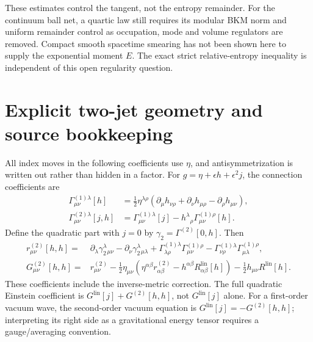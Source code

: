 \documentclass[12pt]{article}
\theoremstyle{definition}
\theoremstyle{remark}
\newcommand{\Glin}{G^{\mathrm{lin}}}
\begin{document}
These estimates control the tangent, not the entropy remainder.
For the continuum ball net, a quartic law still requires its modular
BKM norm and uniform remainder control as occupation, mode and volume
regulators are removed. Compact smooth spacetime smearing has not
been shown here to supply the exponential moment $E$.
The exact strict relative-entropy inequality is independent of this
open regularity question.

\section{Explicit two-jet geometry and source bookkeeping}
\label{app:twojet}

All index moves in the following coefficients use $\eta$, and
antisymmetrization is written out rather than hidden in a factor.
For $g=\eta+\epsilon h+\epsilon^2j$, the connection coefficients are
\begin{align*}
 \Gamma^{(1)\lambda}_{\mu\nu}[h]
 &=\tfrac12\eta^{\lambda\rho}
  (\partial_\mu h_{\nu\rho}+\partial_\nu h_{\mu\rho}
                               -\partial_\rho h_{\mu\nu}),\\
 \Gamma^{(2)\lambda}_{\mu\nu}[j,h]
 &=\Gamma^{(1)\lambda}_{\mu\nu}[j]
   -h^\lambda{}_{\rho}\Gamma^{(1)\rho}_{\mu\nu}[h].
\end{align*}
Define the quadratic part with $j=0$ by $\gamma_2=\Gamma^{(2)}[0,h]$.
Then
\begin{align*}
 r^{(2)}_{\mu\nu}[h,h]
 ={}&\partial_\lambda\gamma_2^\lambda{}_{\mu\nu}
       -\partial_\nu\gamma_2^\lambda{}_{\mu\lambda}
       +\Gamma^{(1)\lambda}_{\lambda\rho}\Gamma^{(1)\rho}_{\mu\nu}
       -\Gamma^{(1)\lambda}_{\nu\rho}\Gamma^{(1)\rho}_{\mu\lambda},\\
 G^{(2)}_{\mu\nu}[h,h]
 ={}&r^{(2)}_{\mu\nu}
       -\tfrac12\eta_{\mu\nu}
          (\eta^{\alpha\beta}r^{(2)}_{\alpha\beta}
                       -h^{\alpha\beta}R^{\mathrm{lin}}_{\alpha\beta}[h])
       -\tfrac12h_{\mu\nu}R^{\mathrm{lin}}[h].
\end{align*}
These coefficients include the inverse-metric correction. The full
quadratic Einstein coefficient is $\Glin[j]+G^{(2)}[h,h]$, not
$\Glin[j]$ alone. For a first-order vacuum wave, the second-order
vacuum equation is $\Glin[j]=-G^{(2)}[h,h]$; interpreting its right
side as a gravitational energy tensor requires a gauge/averaging convention.
\end{document}
